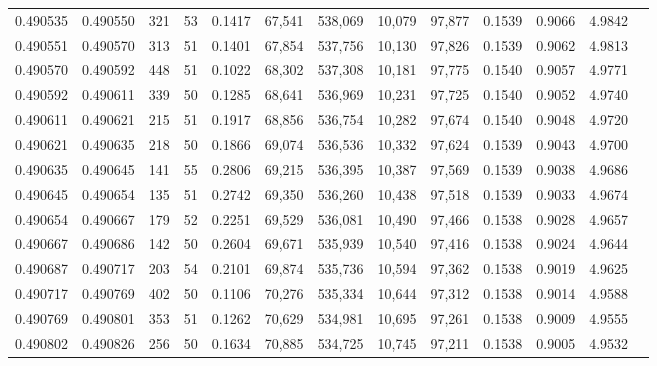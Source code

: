 \begin{tabular}{rrrrrrrrrrrrr}
0.490535 & 0.490550 & 321 &  53 &                                     0.1417 &  67,541 & 538,069 &  10,079 &  97,877 & 0.1539 & 0.9066 & 4.9842 \\
0.490551 & 0.490570 & 313 &  51 &                                     0.1401 &  67,854 & 537,756 &  10,130 &  97,826 & 0.1539 & 0.9062 & 4.9813 \\
0.490570 & 0.490592 & 448 &  51 &                                     0.1022 &  68,302 & 537,308 &  10,181 &  97,775 & 0.1540 & 0.9057 & 4.9771 \\
0.490592 & 0.490611 & 339 &  50 &                                     0.1285 &  68,641 & 536,969 &  10,231 &  97,725 & 0.1540 & 0.9052 & 4.9740 \\
0.490611 & 0.490621 & 215 &  51 &                                     0.1917 &  68,856 & 536,754 &  10,282 &  97,674 & 0.1540 & 0.9048 & 4.9720 \\
0.490621 & 0.490635 & 218 &  50 &                                     0.1866 &  69,074 & 536,536 &  10,332 &  97,624 & 0.1539 & 0.9043 & 4.9700 \\
0.490635 & 0.490645 & 141 &  55 &                                     0.2806 &  69,215 & 536,395 &  10,387 &  97,569 & 0.1539 & 0.9038 & 4.9686 \\
0.490645 & 0.490654 & 135 &  51 &                                     0.2742 &  69,350 & 536,260 &  10,438 &  97,518 & 0.1539 & 0.9033 & 4.9674 \\
0.490654 & 0.490667 & 179 &  52 &                                     0.2251 &  69,529 & 536,081 &  10,490 &  97,466 & 0.1538 & 0.9028 & 4.9657 \\
0.490667 & 0.490686 & 142 &  50 &                                     0.2604 &  69,671 & 535,939 &  10,540 &  97,416 & 0.1538 & 0.9024 & 4.9644 \\
0.490687 & 0.490717 & 203 &  54 &                                     0.2101 &  69,874 & 535,736 &  10,594 &  97,362 & 0.1538 & 0.9019 & 4.9625 \\
0.490717 & 0.490769 & 402 &  50 &                                     0.1106 &  70,276 & 535,334 &  10,644 &  97,312 & 0.1538 & 0.9014 & 4.9588 \\
0.490769 & 0.490801 & 353 &  51 &                                     0.1262 &  70,629 & 534,981 &  10,695 &  97,261 & 0.1538 & 0.9009 & 4.9555 \\
0.490802 & 0.490826 & 256 &  50 &                                     0.1634 &  70,885 & 534,725 &  10,745 &  97,211 & 0.1538 & 0.9005 & 4.9532 \\

\end{tabular}
